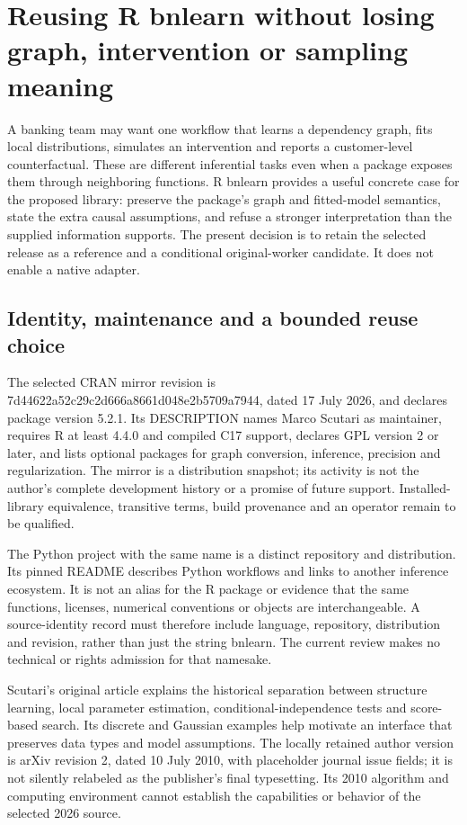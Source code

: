 \section{Reusing R bnlearn without losing graph, intervention or sampling meaning}
\label{sec:exec24-bnlearn-reuse}
A banking team may want one workflow that learns a dependency graph, fits local distributions, simulates an intervention and reports a customer-level counterfactual. These are different inferential tasks even when a package exposes them through neighboring functions. R bnlearn provides a useful concrete case for the proposed library: preserve the package's graph and fitted-model semantics, state the extra causal assumptions, and refuse a stronger interpretation than the supplied information supports. The present decision is to retain the selected release as a reference and a conditional original-worker candidate. It does not enable a native adapter.\citep{exec24_bnlearn_sources,exec24_bnlearn_contract}

\subsection{Identity, maintenance and a bounded reuse choice}
The selected CRAN mirror revision is 7d44622a52c29c2d666a8661d048e2b5709a7944, dated 17 July 2026, and declares package version 5.2.1. Its DESCRIPTION names Marco Scutari as maintainer, requires R at least 4.4.0 and compiled C17 support, declares GPL version 2 or later, and lists optional packages for graph conversion, inference, precision and regularization. The mirror is a distribution snapshot; its activity is not the author's complete development history or a promise of future support. Installed-library equivalence, transitive terms, build provenance and an operator remain to be qualified.\citep{exec24_bnlearn_sources}

The Python project with the same name is a distinct repository and distribution. Its pinned README describes Python workflows and links to another inference ecosystem. It is not an alias for the R package or evidence that the same functions, licenses, numerical conventions or objects are interchangeable. A source-identity record must therefore include language, repository, distribution and revision, rather than just the string bnlearn. The current review makes no technical or rights admission for that namesake.\citep{exec24_bnlearn_identity,exec24_bnlearn_contract}

Scutari's original article explains the historical separation between structure learning, local parameter estimation, conditional-independence tests and score-based search. Its discrete and Gaussian examples help motivate an interface that preserves data types and model assumptions. The locally retained author version is arXiv revision 2, dated 10 July 2010, with placeholder journal issue fields; it is not silently relabeled as the publisher's final typesetting. Its 2010 algorithm and computing environment cannot establish the capabilities or behavior of the selected 2026 source.\citep{exec24_bnlearn_original}

